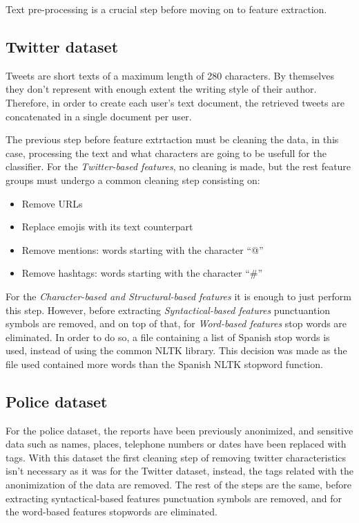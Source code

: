Text pre-processing is a crucial step before moving on to feature extraction.

\subsection{Twitter dataset}
Tweets are short texts of a maximum length of 280 characters. By themselves they don't represent with enough extent the writing style of their author. Therefore, in order to create each user's text document, the retrieved tweets are concatenated in a single document per user. 

The previous step before feature extrtaction must be cleaning the data, in this case, processing the text and what characters are going to be usefull for the classifier. For the \textit{Twitter-based features}, no cleaning is made, but the rest feature groups must undergo a common cleaning step consisting on:
\begin{itemize}
    \item Remove URLs
    \item Replace emojis with its text counterpart
    \item Remove mentions: words starting with the character ``@''
    \item Remove hashtags: words starting with the character ``\#''
\end{itemize}
For the \textit{Character-based and Structural-based features} it is enough to just perform this step. However, before extracting \textit{Syntactical-based features} punctuantion symbols are removed, and on top of that, for \textit{Word-based features} stop words are eliminated. In order to do so, a file containing a list of Spanish stop words is used, instead of using the common NLTK library. This decision was made as the file used contained more words than the Spanish NLTK stopword function. 

\subsection{Police dataset}
For the police dataset, the reports have been previously anonimized, and sensitive data such as names, places, telephone numbers or dates have been replaced with tags. With this dataset the first cleaning step of removing twitter characteristics isn't necessary as it was for the Twitter dataset, instead, the tags related with the anonimization of the data are removed. The rest of the steps are the same, before extracting syntactical-based features punctuation symbols are removed, and for the word-based features stopwords are eliminated.